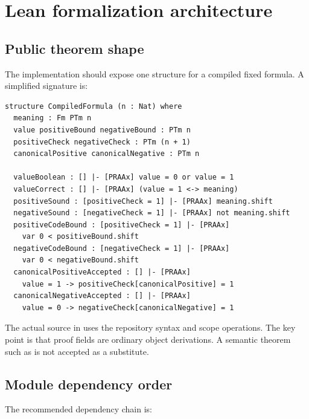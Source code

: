 \section{Lean formalization architecture}

\subsection{Public theorem shape}

The implementation should expose one structure for a compiled fixed formula.
A simplified signature is:

\begin{lstlisting}[language={},caption={Core package shape}]
structure CompiledFormula (n : Nat) where
  meaning : Fm PTm n
  value positiveBound negativeBound : PTm n
  positiveCheck negativeCheck : PTm (n + 1)
  canonicalPositive canonicalNegative : PTm n

  valueBoolean : [] |- [PRAAx] value = 0 or value = 1
  valueCorrect : [] |- [PRAAx] (value = 1 <-> meaning)
  positiveSound : [positiveCheck = 1] |- [PRAAx] meaning.shift
  negativeSound : [negativeCheck = 1] |- [PRAAx] not meaning.shift
  positiveCodeBound : [positiveCheck = 1] |- [PRAAx]
    var 0 < positiveBound.shift
  negativeCodeBound : [negativeCheck = 1] |- [PRAAx]
    var 0 < negativeBound.shift
  canonicalPositiveAccepted : [] |- [PRAAx]
    value = 1 -> positiveCheck[canonicalPositive] = 1
  canonicalNegativeAccepted : [] |- [PRAAx]
    value = 0 -> negativeCheck[canonicalNegative] = 1
\end{lstlisting}

The actual source in  uses the repository
syntax and scope operations.  The key point is that proof fields are ordinary
object derivations.  A semantic theorem such as
 is not accepted as a substitute.

\subsection{Module dependency order}

The recommended dependency chain is:

